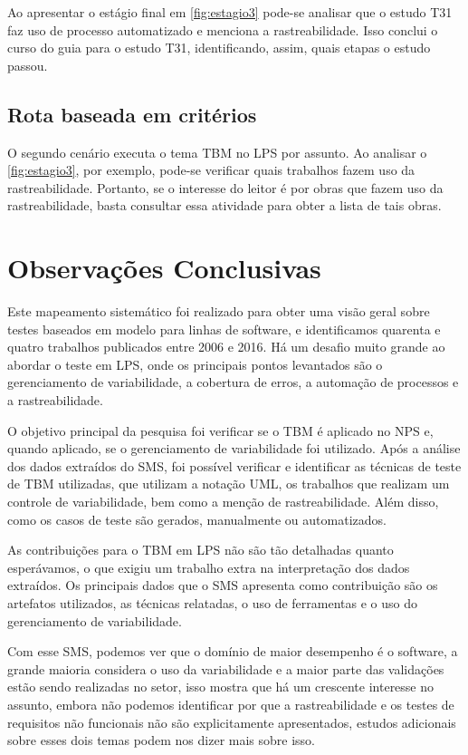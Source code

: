Ao apresentar o estágio final em \ref{fig:estagio3} pode-se analisar que o estudo T31 faz uso de processo automatizado e menciona a rastreabilidade. Isso conclui o curso do guia para o estudo T31, identificando, assim, quais etapas o estudo passou.

\subsection{Rota baseada em critérios}

O segundo cenário executa o tema TBM no LPS por assunto. Ao analisar o \ref{fig:estagio3}, por exemplo, pode-se verificar quais trabalhos fazem uso da rastreabilidade. Portanto, se o interesse do leitor é por obras que fazem uso da rastreabilidade, basta consultar essa atividade para obter a lista de tais obras.


\section{Observações Conclusivas}


Este mapeamento sistemático foi realizado para obter uma visão geral sobre testes baseados em modelo para linhas de software, e identificamos quarenta e quatro trabalhos publicados entre 2006 e 2016.
Há um desafio muito grande ao abordar o teste em LPS, onde os principais pontos levantados são o gerenciamento de variabilidade, a cobertura de erros, a automação de processos e a rastreabilidade.

O objetivo principal da pesquisa foi verificar se o TBM é aplicado no NPS e, quando aplicado, se o gerenciamento de variabilidade foi utilizado.
Após a análise dos dados extraídos do SMS, foi possível verificar e identificar as técnicas de teste de TBM utilizadas, que utilizam a notação UML, os trabalhos que realizam um controle de variabilidade, bem como a menção de rastreabilidade. Além disso, como os casos de teste são gerados, manualmente ou automatizados.

As contribuições para o TBM em LPS não são tão detalhadas quanto esperávamos, o que exigiu um trabalho extra na interpretação dos dados extraídos. Os principais dados que o SMS apresenta como contribuição são os artefatos utilizados, as técnicas relatadas, o uso de ferramentas e o uso do gerenciamento de variabilidade.

Com esse SMS, podemos ver que o domínio de maior desempenho é o software, a grande maioria considera o uso da variabilidade e a maior parte das validações estão sendo realizadas no setor, isso mostra que há um crescente interesse no assunto, embora não podemos identificar por que a rastreabilidade e os testes de requisitos não funcionais não são explicitamente apresentados, estudos adicionais sobre esses dois temas podem nos dizer mais sobre isso.

